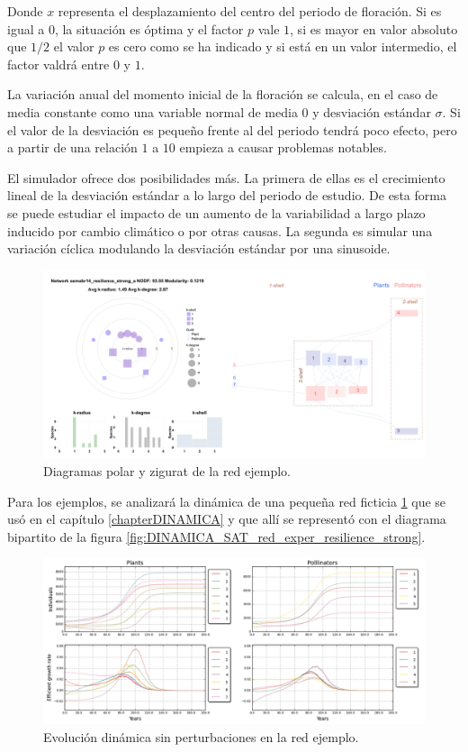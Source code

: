 Donde $x$ representa el desplazamiento del centro del periodo de floración. Si es igual a $0$, la situación es óptima y el factor $p$ vale $1$, si es mayor en valor absoluto que $1/2$ el valor $p$ es cero como se ha indicado y si está en un valor intermedio, el factor valdrá entre $0$ y $1$.

La variación anual del momento inicial de la floración se calcula, en el caso de media constante como una variable normal de media $0$ y desviación estándar $\sigma$. Si el valor de la desviación es pequeño frente al del periodo tendrá poco efecto, pero a partir de una relación $1$ a $10$ empieza a causar problemas notables.

El simulador ofrece dos posibilidades más. La primera de ellas es el crecimiento lineal de la desviación estándar a lo largo del periodo de estudio. De esta forma se puede estudiar el impacto de un aumento de la variabilidad a largo plazo inducido por cambio climático o por otras causas. La segunda es simular una variación cíclica modulando la desviación estándar por una sinusoide.

\begin{figure}[h!]
\centering
\includegraphics[scale=1]{ManFigs/sigmund_oscilacion_diag_red.png}
\caption{Diagramas polar y zigurat de la red ejemplo.}
\label{fig:ASIGMUNDMAN_sigmund_oscilacion_diag_red}
\end{figure}

Para los ejemplos, se analizará la dinámica de una pequeña red ficticia \ref{fig:ASIGMUNDMAN_sigmund_oscilacion_diag_red} que se usó en el capítulo \ref{chapterDINAMICA} y que allí se representó con el diagrama bipartito de la figura \ref{fig:DINAMICA_SAT_red_exper_resilience_strong}.

\begin{figure}[h!]
\centering
\includegraphics[scale=1]{ManFigs/sigmund_red_exper.png}
\caption{Evolución dinámica sin perturbaciones en la red ejemplo.}
\label{fig:ASIGMUNDMAN_sigmund_red_exper}
\end{figure}

